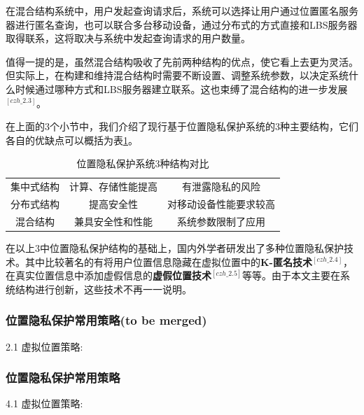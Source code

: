 \documentclass[zihao=-4]{ctexart}
\begin{document}
在混合结构系统中，用户发起查询请求后，系统可以选择让用户通过位置匿名服务器进行匿名查询，也可以联合多台移动设备，通过分布式的方式直接和LBS服务器取得联系，这将取决与系统中发起查询请求的用户数量。
\par
值得一提的是，虽然混合结构吸收了先前两种结构的优点，使它看上去更为灵活。但实际上，在构建和维持混合结构时需要不断设置、调整系统参数，以决定系统什么时候通过哪种方式和LBS服务器建立联系。这也束缚了混合结构的进一步发展$^{[czh\_2.3]}$。
\par \par 
在上面的3个小节中，我们介绍了现行基于位置隐私保护系统的3种主要结构，它们各自的优缺点可以概括为表\ref{3种结构对比}。


\begin{table}[H]
	\caption{位置隐私保护系统3种结构对比}
	\centering
	\label{3种结构对比}
	\begin{tabular}{ccc}
		\hline  
		\makebox[0.1\textwidth][c]{结构名称} & \makebox[0.4\textwidth][c]{优点} & \makebox[0.4\textwidth][c]{缺点}  \\ 
		\hline  
		集中式结构	&	计算、存储性能提高	&	有泄露隐私的风险\\
		分布式结构	&	提高安全性		   &	对移动设备性能要求较高\\
		混合结构	 &	兼具安全性和性能	 & 		系统参数限制了应用\\
		\hline
	\end{tabular} 
\end{table} 


在以上3中位置隐私保护结构的基础上，国内外学者研发出了多种位置隐私保护技术。其中比较著名的有将用户位置信息隐藏在虚拟位置中的\textbf{K-匿名技术}$^{[czh\_2.4]}$，在真实位置信息中添加虚假信息的\textbf{虚假位置技术}$^{[czh\_2.5]}$等等。由于本文主要在系统结构进行创新，这些技术不再一一说明。

\iffalse
\subsubsection{位置隐私保护常用策略(to be merged)}
2.1 虚拟位置策略: \par

\subsubsection{位置隐私保护常用策略}
4.1 虚拟位置策略: \par
\end{document}
